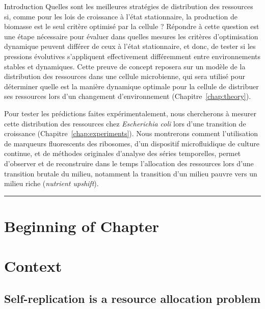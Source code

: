\begin{chapter_summary}{Introduction}
Quelles sont les meilleures stratégies de distribution des ressources si, comme pour les lois de croissance à l'état stationnaire, la production de biomasse est le seul critère optimisé par la cellule ?
Répondre à cette question est une étape nécessaire pour évaluer dans quelles mesures les critères d'optimisation dynamique peuvent différer de ceux à l'état stationnaire, et donc, de tester si les pressions évolutives s'appliquent effectivement différemment entre environnements stables et dynamiques.
Cette preuve de concept reposera sur un modèle de la distribution des ressources dans une cellule microbienne, qui sera utilisé pour déterminer quelle est la manière dynamique optimale pour la cellule de distribuer ses ressources lors d'un changement d'environnement (Chapitre~\ref{chap:theory}).

Pour tester les prédictions faites expérimentalement, nous chercherons à mesurer cette distribution des ressources chez \textit{Escherichia coli} lors d'une transition de croissance (Chapitre~\ref{chap:experiments}).
Nous montrerons comment l'utilisation de marqueurs fluorescents des ribosomes, d'un dispositif microfluidique de culture continue, et de méthodes originales d'analyse des séries temporelles, permet d'observer et de reconstruire dans le temps l'allocation des ressources lors d'une transition brutale du milieu, notamment la transition d'un milieu pauvre vers un milieu riche (\textit{nutrient upshift}).
\end{chapter_summary}

\begin{center}
\noindent\rule{4cm}{0.1pt}
\end{center}

\section*{Beginning of Chapter \thechapter}
\section{Context}
\label{sec:context}

\subsection{Self-replication is a resource allocation problem}

